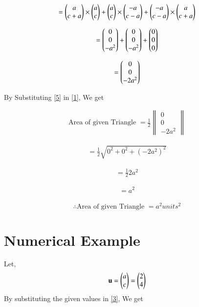 \documentclass[journal,12pt,twocolumn]{IEEEtran}
\renewcommand\thesection{\arabic{section}}
\begin{document}
\begin{enumerate}[label=\thesection.\arabic*.,ref=\thesection.\theenumi]
\begin{align}
=\begin{pmatrix}a\\c+a\end{pmatrix}\times\begin{pmatrix}a\\c\end{pmatrix}+\begin{pmatrix}a\\c\end{pmatrix}\times\begin{pmatrix}-a\\c-a\end{pmatrix}+\begin{pmatrix}-a\\c-a\end{pmatrix}\times\begin{pmatrix}a\\c+a\end{pmatrix}
\end{align}

\begin{align}
=\begin{pmatrix}0\\0\\-a^2\end{pmatrix}+\begin{pmatrix}0\\0\\-a^2\end{pmatrix}+\begin{pmatrix}0\\0\\0\end{pmatrix}
\end{align}

\begin{align}
=\begin{pmatrix}0\\0\\-2a^2\end{pmatrix}
\label{5}
\end{align}

By Substituting \eqref{5} in \eqref{1}, We get

\begin{align}
\text{Area of given Triangle }=\frac{1}{2}\begin{Vmatrix}
0\\0\\-2a^2
\end{Vmatrix}
\end{align}

\begin{align}
= \frac{1}{2}\sqrt{0^2 + 0^2+ (-2a^2)^2}   
\end{align}

\begin{align}
= \frac{1}{2} 2a^2   
\end{align}

\begin{align}
=a^2
\end{align}

\begin{align}
\boxed{\therefore \text{Area of given Triangle }=a^2 units^2}
\label{4}
\end{align}

\section{Numerical Example}
Let,
\begin{align}
\mathbf{u}=\begin{pmatrix}a\\c\end{pmatrix}=\begin{pmatrix}2\\4\end{pmatrix}
\end{align}
\solution
By substituting the given values in \eqref{3}, We get


\end{enumerate}
\end{document}
